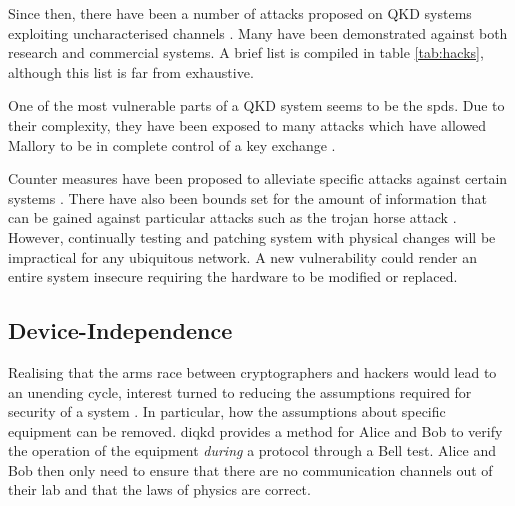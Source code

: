 Since then, there have been a number of attacks proposed on \ac{QKD} systems exploiting uncharacterised channels \cite{xu2019quantum}. Many have been demonstrated against both research and commercial systems. A brief list is compiled in table \ref{tab:hacks}, although this list is far from exhaustive. 


One of the most vulnerable parts of a \ac{QKD} system seems to be the \acp{spd}. Due to their complexity, they have been exposed to many attacks which have allowed Mallory to be in complete control of a key exchange \cite{Makarov2006, Gerhardt2011a, Lydersen2010a, Lydersen2010b, Lydersen2011, Sauge2011, Makarov2009, Wiechers2011}.


Counter measures have been proposed to alleviate specific attacks against certain systems \cite{Lydersen2010c, Yuan2010}. There have also been bounds set for the amount of information that can be gained against particular attacks such as the trojan horse attack \cite{Lucamarini2015Practical}. However, continually testing and patching system with physical changes will be impractical for any ubiquitous network. A new vulnerability could render an entire system insecure requiring the hardware to be modified or replaced.


\subsection{Device-Independence}

Realising that the arms race between cryptographers and hackers would lead to an unending cycle, interest turned to reducing the assumptions required for security of a system \cite{Mayers1998, Acin2007, Barrett2005}. In particular, how the assumptions about specific equipment can be removed. \Ac{diqkd} provides a method for Alice and Bob to verify the operation of the equipment \emph{during} a protocol through a Bell test. Alice and Bob then only need to ensure that there are no communication channels out of their lab and that the laws of physics are correct. 

